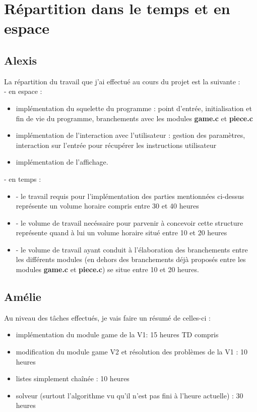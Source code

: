 \documentclass{report}
\begin{document}
\section{Répartition dans le temps et en espace}
\subsection*{Alexis}
La répartition du travail que j'ai effectué au cours du projet est la suivante :\\
- en espace :
\begin{itemize}
\item implémentation du squelette du programme : point d'entrée, initialisation et fin de vie du programme, branchements avec les modules \textbf{game.c} et \textbf{piece.c}
\item implémentation de l'interaction avec l'utilisateur : gestion des paramètres, interaction sur l'entrée pour récupérer les instructions utilisateur
\item implémentation de l'affichage.
\end{itemize}
- en temps :
\begin{itemize}
\item
- le travail requis pour l'implémentation des parties mentionnées ci-dessus représente un volume horaire compris entre 30 et 40 heures 
\item
- le volume de travail necéssaire pour parvenir à concevoir cette structure représente quand à lui un volume horaire situé entre 10 et 20 heures 
\item
- le volume de travail ayant conduit à l'élaboration des branchements entre les différents modules (en dehors des branchements déjà proposés entre les modules \textbf{game.c} et \textbf{piece.c}) se situe entre 10 et 20 heures.
\end{itemize}

\subsection*{Amélie}
Au niveau des tâches effectués, je vais faire un résumé de celles-ci :
\begin{itemize}
\item implémentation du module game de la V1:  15 heures TD compris
\item modification du module game V2 et résolution des problèmes de la V1 : 10 heures
\item listes simplement chaînée : 10 heures
\item solveur (surtout l'algorithme vu qu'il n'est pas fini à l'heure actuelle) : 30 heures
\end{itemize}
\end{document}
